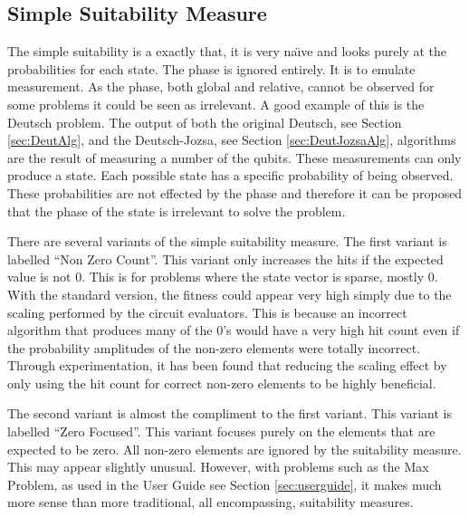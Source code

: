 \subsection{Simple Suitability Measure}
\label{sec:simplsuitmeas}
The simple suitability is a exactly that, it is very na\"{\i}ve and looks purely at the probabilities for each state.
The phase is ignored entirely.
It is to emulate measurement.
As the phase, both global and relative, cannot be observed for some problems it could be seen as irrelevant.
A good example of this is the Deutsch problem.
The output of both the original Deutsch, see Section \ref{sec:DeutAlg}, and the Deutsch-Jozsa, see Section \ref{sec:DeutJozsaAlg}, algorithms are the result of measuring a number of the qubits.
These measurements can only produce a state.
Each possible state has a specific probability of being observed.
These probabilities are not effected by the phase and therefore it can be proposed that the phase of the state is irrelevant to solve the problem.

There are several variants of the simple suitability measure.
The first variant is labelled ``Non Zero Count''.
This variant only increases the hits if the expected value is not $0$.
This is for problems where the state vector is sparse, mostly $0$.
With the standard version, the fitness could appear very high simply due to the scaling performed by the circuit evaluators.
This is because an incorrect algorithm that produces many of the $0$'s would have a very high hit count even if the probability amplitudes of the non-zero elements were totally incorrect.
Through experimentation, it has been found that reducing the scaling effect by only using the hit count for correct non-zero elements to be highly beneficial.

The second variant is almost the compliment to the first variant.
This variant is labelled ``Zero Focused''.
This variant focuses purely on the elements that are expected to be zero.
All non-zero elements are ignored by the suitability measure.
This may appear slightly unusual.
However, with problems such as the Max Problem, as used in the User Guide see Section \ref{sec:userguide}, it makes much more sense than more traditional, all encompassing, suitability measures.

